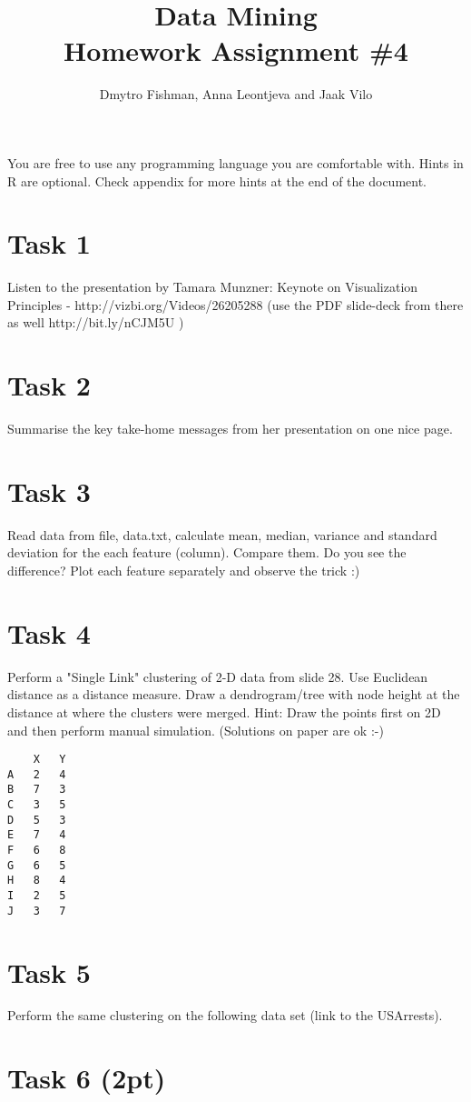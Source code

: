 \documentclass{article}
\title{Data Mining\\Homework Assignment \#4} %
\author{Dmytro Fishman, Anna Leontjeva and Jaak Vilo} %
\begin{document}
\maketitle %

You are free to use any programming language you are comfortable with. Hints in R are optional. Check appendix for more hints at the end of the document.

\section*{Task 1}
Listen to the presentation by Tamara Munzner: Keynote on Visualization Principles - http://vizbi.org/Videos/26205288 (use the PDF slide-deck from there as well http://bit.ly/nCJM5U )
\section*{Task 2}
Summarise the key take-home messages from her presentation on one nice page.

\section*{Task 3}
Read data from file, data.txt, calculate mean, median, variance and standard deviation for the each feature (column). Compare them. Do you see the difference? Plot each feature separately and observe the trick :)

\section*{Task 4}
Perform a "Single Link" clustering of 2-D data from slide 28. Use Euclidean distance as a distance measure. Draw a dendrogram/tree with node height at the distance at where the clusters were merged. Hint: Draw the points first on 2D and then perform manual simulation. (Solutions on paper are ok :-)
\begin{lstlisting}
	X	Y
A	2	4
B	7	3
C	3	5
D	5	3
E	7	4
F	6	8
G	6	5
H	8	4
I	2	5
J	3	7
\end{lstlisting}

\section*{Task 5}
Perform the same clustering on the following data set (link to the USArrests).
\section*{Task 6 (2pt)}
\end{document}
